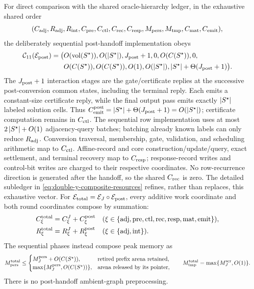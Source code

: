 \begin{theorem}
For direct comparison with the shared oracle-hierarchy ledger, in the
exhaustive shared order
\begin{equation*}
 (C_{\rm adj},R_{\rm adj},R_{\rm int},C_{\rm pre},C_{\rm ctl},C_{\rm rec},
 C_{\rm resp},M_{\rm pers},M_{\rm tmp},C_{\rm mat},C_{\rm emit}),
\end{equation*}
the deliberately sequential post-handoff implementation obeys
\begin{equation}
 \begin{aligned}
 \mathcal C_{11}(\mathcal E_{\rm post})
 =\bigl(&O(\operatorname{vol}(S^\star)),O(\left\lvert S^\star \right\rvert),J_{\rm post}+1,0,
 O(C(S^\star)),0,\\
 &O(C(S^\star)),O(C(S^\star)),O(1),
 O(\left\lvert S^\star \right\rvert),
 \left\lvert S^\star \right\rvert+\Theta(J_{\rm post}+1)\bigr).
 \end{aligned}
 \label{eq:double-y-composite-eleven-vector}
\end{equation}
The $J_{\rm post}+1$ interaction stages are the gate/certificate replies at
the successive post-conversion common states, including the terminal reply.
Each emits a constant-size certificate reply, while the final output pass
emits exactly $\left\lvert S^\star \right\rvert$ labeled solution cells.  Thus
$C_{\rm emit}^{\rm post}
=\left\lvert S^\star \right\rvert+\Theta(J_{\rm post}+1)=O(\left\lvert S^\star \right\rvert)$; certificate
computation remains in $C_{\rm ctl}$.
The sequential row implementation uses at most
$2\left\lvert S^\star \right\rvert+O(1)$ adjacency-query batches; batching already known labels
can only reduce $R_{\rm adj}$.  Conversion traversal, membership, gate,
validation, and scheduling arithmetic map to $C_{\rm ctl}$.  Affine-record and
core construction/update/query, exact settlement, and terminal recovery map
to $C_{\rm resp}$; response-record writes and control-bit writes are charged
to their respective coordinates.  No row-recurrence direction is generated
after the handoff, so the shared $C_{\rm rec}$ is zero.  The detailed
subledger in \cref{eq:double-y-composite-resources} refines, rather than
replaces, this exhaustive vector.
For $\mathcal E_{\rm total}=\mathcal E_J\circ\mathcal E_{\rm post}$, every
additive work coordinate and both round coordinates compose by summation:
\begin{align*}
 C_\xi^{\rm total}&=C_\xi^J+C_\xi^{\rm post}
 &&(\xi\in\{\mathrm{adj},\mathrm{pre},\mathrm{ctl},\mathrm{rec},
              \mathrm{resp},\mathrm{mat},\mathrm{emit}\}),\\
 R_\xi^{\rm total}&=R_\xi^J+R_\xi^{\rm post}
 &&(\xi\in\{\mathrm{adj},\mathrm{int}\}).
\end{align*}
The sequential phases instead compose peak memory as
\begin{equation*}
 M_{\rm pers}^{\rm total}\leq
 \begin{cases}
  M_J^{\rm pers}+O(C(S^\star)),&\text{retired prefix arena retained},\\
  \max\{M_J^{\rm pers},O(C(S^\star))\},&\text{arena released by its pointer},
 \end{cases}
 \qquad
 M_{\rm tmp}^{\rm total}=\max\{M_J^{\rm scr},O(1)\}.
\end{equation*}
There is no post-handoff ambient-graph preprocessing.


\end{theorem}
